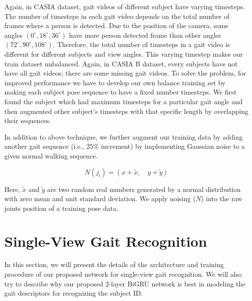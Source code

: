 Again, in CASIA dataset, gait videos of different subject have varying timesteps. The number of timesteps in each gait video depends on the total number of frames where a person is detected. Due to the position of the camera, some angles ${(0^{\circ}, 18^{\circ}, 36^{\circ})}$ have more person detected frame than other angles ${(72^{\circ}, 90^{\circ}, 108^{\circ})}$. Therefore, the total number of timesteps in a gait video is different for different subjects and view angles. This varying timestep makes our train dataset unbalanced. Again, in CASIA B dataset, every subjects have not have all gait videos; there are some missing gait videos. To solve the problem, for improved performance we have to develop our own balance training set by making each subject pose sequence to have a fixed number timesteps. We first found the subject which had maximum timesteps for a particular gait angle and then augmented other subject's timesteps with that specific length by overlapping their sequences.

In addition to above technique, we further augment our training data by adding another gait sequence (i.e., $ 25\% $ increment) by implementing Gaussian noise to a given normal walking sequence. 

\begin{equation}
N(j_i) = (x + \tilde{x},  \quad y+ \tilde{y})
\end{equation}

Here,  $\tilde{x}$ and $\tilde{y}$ are two random real numbers generated by a normal distribution with zero mean and unit standard deviation. We apply noising ($ N $) into the raw joints position of a training pose data.



\section{Single-View Gait Recognition}
In this section, we will present the details of the architecture and training procedure of our proposed network for single-view gait recognition. We will also try to describe why our proposed 2-layer BiGRU network is best in modeling the gait descriptors for recognizing the subject ID.

